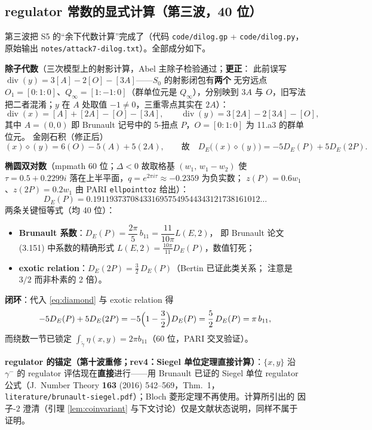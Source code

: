 \documentclass[11pt,a4paper]{ctexart}
\theoremstyle{remark}
\newcommand{\bN}{b_{11}}
\begin{document}
\subsection{regulator 常数的显式计算（第三波，40 位）}\label{sec:regulator}

第三波把 S5 的``余下代数计算''完成了（代码 \texttt{code/dilog.gp} + \texttt{code/dilog.py}，
原始输出 \texttt{notes/attack7-dilog.txt}）。全部成分如下。

\textbf{除子代数}（三次模型上的射影计算，Abel 主除子检验通过；\textbf{更正}：
此前误写 $\operatorname{div}(y)=3[A]-2[O]-[3A]$——$S_0$ 的射影闭包有\textbf{两个}
无穷远点 $O_1=[0:1:0]$、$Q_\infty=[1:-1:0]$（群单位元是 $Q_\infty$），分别映到
$3A$ 与 $O$，旧写法把二者混淆；$y$ 在 $A$ 处取值 $-1\ne0$，三重零点其实在 $2A$）：
\begin{equation}\label{eq:divs}
\operatorname{div}(x)=[A]+[2A]-[O]-[3A],\qquad \operatorname{div}(y)=3[2A]-2[3A]-[O],
\end{equation}
其中 $A=(0,0)$ 即 Brunault 记号中的 5-扭点 $P$，$O=[0:1:0]$ 为 11.a3 的群单位元。
金刚石积（修正后）
\begin{equation}\label{eq:diamond}
(x)\diamond(y)=6(O)-5(A)+5(2A),\qquad\text{故}\quad
D_E\bigl((x)\diamond(y)\bigr)=-5D_E(P)+5D_E(2P).
\end{equation}

\textbf{椭圆双对数}（mpmath 60 位；$\Delta<0$ 故取格基 $(w_1,\,w_1-w_2)$ 使
$\tau=0.5+0.2299i$ 落在上半平面，$q=e^{2\pi i\tau}\approx-0.2359$ 为负实数；
$z(P)=0.6w_1$、$z(2P)=0.2w_1$ 由 PARI \texttt{ellpointtoz} 给出）：
\[
D_E(P)=0.1911937370843316957549544343121738161012\ldots
\]
两条关键恒等式（均 40 位）：
\begin{itemize}[nosep]
\item \textbf{Brunault 系数}：$D_E(P)=\dfrac{2\pi}{5}\,\bN=\dfrac{11}{10\pi}L(E,2)$，
即 Brunault 论文 (3.151) 中系数的精确形式 $L(E,2)=\frac{10\pi}{11}D_E(P)$，数值钉死；
\item \textbf{exotic relation}：$D_E(2P)=\frac32\,D_E(P)$（Bertin 已证此类关系；
注意是 $3/2$ 而非朴素的 2 倍）。
\end{itemize}

\textbf{闭环}：代入 \eqref{eq:diamond} 与 exotic relation 得
\[
-5D_E(P)+5D_E(2P)=-5\Bigl(1-\frac32\Bigr)D_E(P)=\frac52\,D_E(P)=\pi\,\bN,
\]
而绕数一节已锁定 $\int_{\tilde\gamma}\eta(x,y)=2\pi\bN$（60 位，PARI 交叉验证）。

\textbf{regulator 的锚定（第十波重修；rev4：Siegel 单位定理直接计算）}：$\{x,y\}$ 沿
$\gamma^-$ 的 regulator 评估现在\textbf{直接}进行——用 Brunault 已证的 Siegel 单位
regulator 公式（J.~Number Theory \textbf{163} (2016) 542--569，Thm.~1，
\texttt{literature/brunault-siegel.pdf}）；Bloch 菱形定理不再使用。计算所引出的
因子-$2$ 澄清（引理 \ref{lem:coinvariant} 与下文讨论）仅是文献状态说明，同样不属于
证明。
\end{document}
